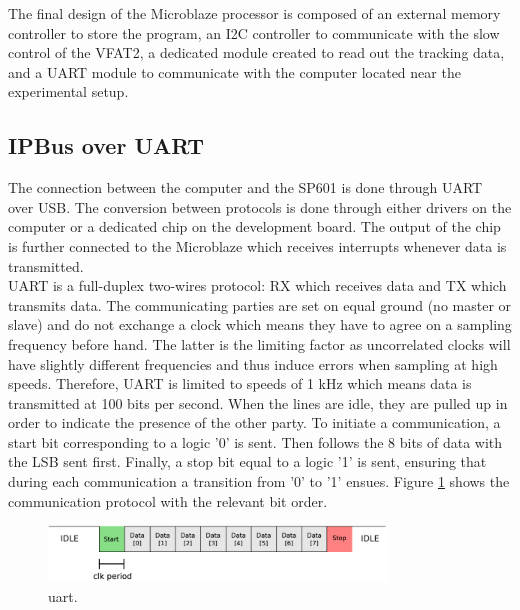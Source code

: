       The final design of the Microblaze processor is composed of an external memory controller to store the program, an I2C controller to communicate with the slow control of the VFAT2, a dedicated module created to read out the tracking data, and a UART module to communicate with the computer located near the experimental setup.

    \subsection{IPBus over UART}

      The connection between the computer and the SP601 is done through UART over USB. The conversion between protocols is done through either drivers on the computer or a dedicated chip on the development board. The output of the chip is further connected to the Microblaze which receives interrupts whenever data is transmitted. \\

      UART is a full-duplex two-wires protocol: RX which receives data and TX which transmits data. The communicating parties are set on equal ground (no master or slave) and do not exchange a clock which means they have to agree on a sampling frequency before hand. The latter is the limiting factor as uncorrelated clocks will have slightly different frequencies and thus induce errors when sampling at high speeds. Therefore, UART is limited to speeds of 1 kHz which means data is transmitted at 100 bits per second. When the lines are idle, they are pulled up in order to indicate the presence of the other party. To initiate a communication, a start bit corresponding to a logic '0' is sent. Then follows the 8 bits of data with the LSB sent first. Finally, a stop bit equal to a logic '1' is sent, ensuring that during each communication a transition from '0' to '1' ensues. Figure \ref{fig:III-1-uart} shows the communication protocol with the relevant bit order. \\

      \begin{figure}[h!]
        \centering
        \includegraphics[width=0.8\textwidth]{img/III-1-arch/uart.png}
        \caption{uart.}
        \label{fig:III-1-uart}
      \end{figure}

